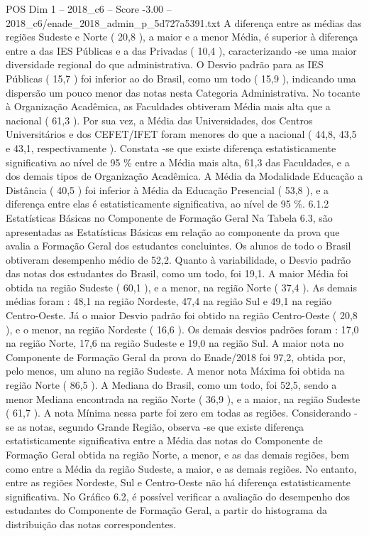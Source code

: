 \begin{textsample}{POS Dim 1 – 2018\_c6 – Score -3.00 – 2018\_c6/enade\_2018\_admin\_p\_5d727a5391.txt}
A diferença entre as médias das regiões Sudeste e Norte ( 20,8 ), a maior e a menor Média, é superior à diferença entre a das IES Públicas e a das Privadas ( 10,4 ), caracterizando -se uma maior diversidade regional do que administrativa.
O Desvio padrão para as IES Públicas ( 15,7 ) foi inferior ao do Brasil, como um todo ( 15,9 ), indicando uma dispersão um pouco menor das notas nesta Categoria Administrativa.
No tocante à Organização Acadêmica, as Faculdades obtiveram Média mais alta que a nacional ( 61,3 ).
Por sua vez, a Média das Universidades, dos Centros Universitários e dos CEFET/IFET foram menores do que a nacional ( 44,8, 43,5 e 43,1, respectivamente ).
Constata -se que existe diferença estatisticamente significativa ao nível de 95 \% entre a Média mais alta, 61,3 das Faculdades, e a dos demais tipos de Organização Acadêmica.
A Média da Modalidade Educação a Distância ( 40,5 ) foi inferior à Média da Educação Presencial ( 53,8 ), e a diferença entre elas é estatisticamente significativa, ao nível de 95 \%. 6.1.2 Estatísticas Básicas no Componente de Formação Geral Na Tabela 6.3, são apresentadas as Estatísticas Básicas em relação ao componente da prova que avalia a Formação Geral dos estudantes concluintes.
Os alunos de todo o Brasil obtiveram desempenho médio de 52,2.
Quanto à variabilidade, o Desvio padrão das notas dos estudantes do Brasil, como um todo, foi 19,1.
A maior Média foi obtida na região Sudeste ( 60,1 ), e a menor, na região Norte ( 37,4 ).
As demais médias foram : 48,1 na região Nordeste, 47,4 na região Sul e 49,1 na região Centro-Oeste.
Já o maior Desvio padrão foi obtido na região Centro-Oeste ( 20,8 ), e o menor, na região Nordeste ( 16,6 ).
Os demais desvios padrões foram : 17,0 na região Norte, 17,6 na região Sudeste e 19,0 na região Sul.
A maior nota no Componente de Formação Geral da prova do Enade/2018 foi 97,2, obtida por, pelo menos, um aluno na região Sudeste.
A menor nota Máxima foi obtida na região Norte ( 86,5 ).
A Mediana do Brasil, como um todo, foi 52,5, sendo a menor Mediana encontrada na região Norte ( 36,9 ), e a maior, na região Sudeste ( 61,7 ).
A nota Mínima nessa parte foi zero em todas as regiões.
Considerando -se as notas, segundo Grande Região, observa -se que existe diferença estatisticamente significativa entre a Média das notas do Componente de Formação Geral obtida na região Norte, a menor, e as das demais regiões, bem como entre a Média da região Sudeste, a maior, e as demais regiões.
No entanto, entre as regiões Nordeste, Sul e Centro-Oeste não há diferença estatisticamente significativa.
No Gráfico 6.2, é possível verificar a avaliação do desempenho dos estudantes do Componente de Formação Geral, a partir do histograma da distribuição das notas correspondentes.

\end{textsample}
